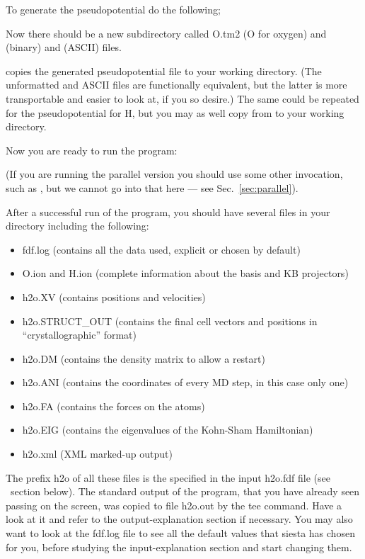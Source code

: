 To generate the pseudopotential do the following;


\noindent
Now there should be a new subdirectory called O.tm2 (O for oxygen)
and  (binary) and  (ASCII) files.


\noindent
copies the generated pseudopotential file to your working directory.
(The unformatted and ASCII files are functionally equivalent, but
the latter is more transportable and easier to look at, if you so
desire.) The same could be repeated for the pseudopotential for H,
but you may as well copy  from 
to your  working directory.

\noindent
Now you are ready to run the program:


\noindent
(If you are running the parallel version you should use some other
invocation, such as , but we cannot
go into that here --- see Sec.~\ref{sec:parallel}).

After a successful run of the program, you should have several
files in your directory including the following:
\begin{itemize}

\item fdf.log
 (contains all the data used, explicit or chosen by default)
\item O.ion and H.ion
 (complete information about the basis and KB projectors)
\item h2o.XV
 (contains positions and velocities)
\item h2o.STRUCT\_OUT
 (contains the final cell vectors and positions in
 ``crystallographic'' format)
\item h2o.DM
 (contains the density matrix to allow a restart)
\item h2o.ANI
 (contains the coordinates of every MD step, in this case only one)
\item h2o.FA
 (contains the forces on the atoms)
\item h2o.EIG
 (contains the eigenvalues of the Kohn-Sham Hamiltonian)
\item h2o.xml
 (XML marked-up output)
\end{itemize}

The prefix h2o of all these files is the 
specified in the input h2o.fdf file (see \fdflib\ section below).
The standard output of the program, that you
have already seen passing on the screen, was copied to
file h2o.out by the tee command. Have a look at it
and refer to the output-explanation section if necessary.
You may also want to look at the fdf.log file to see all
the default values that siesta has chosen for you, before
studying the input-explanation section and start changing them.

